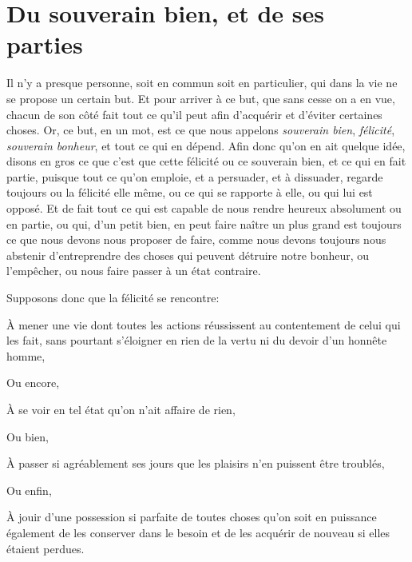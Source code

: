 
\section{Du souverain bien, et de ses parties}

Il n'y a presque personne, soit en commun soit en particulier, qui dans la vie ne se propose un certain
but. Et pour arriver à ce but, que sans cesse on a en vue, chacun de son côté fait tout ce qu'il peut afin
d'acquérir et d'éviter certaines choses. Or, ce but, en un mot, est ce que nous appelons \emph{souverain
bien}, \emph{félicité}, \emph{souverain bonheur}, et tout ce qui en dépend. Afin donc qu'on en ait quelque
idée, disons en gros ce que c'est que cette félicité ou ce souverain bien, et ce qui en fait partie, puisque
tout ce qu'on emploie, et a persuader, et à dissuader, regarde toujours ou la félicité elle même, ou ce qui
se rapporte à elle, ou qui lui est opposé. Et de fait tout ce qui est capable de nous rendre heureux absolument
ou en partie, ou qui, d'un petit bien, en peut faire naître un plus grand est toujours ce que nous devons nous
proposer de faire, comme nous devons toujours nous abstenir d'entreprendre des choses qui peuvent détruire
notre bonheur, ou l'empêcher, ou nous faire passer à un état contraire. 

Supposons donc que la félicité se rencontre:

\begin{emphpar}
     À mener une vie dont toutes les actions réussissent au contentement de celui qui les fait, sans pourtant
	 s'éloigner en rien de la vertu ni du devoir d'un honnête homme,
\end{emphpar}

Ou encore, 

\begin{emphpar}
     À se voir en tel état qu'on n'ait affaire de rien,
\end{emphpar}

Ou bien,

\begin{emphpar}
     À passer si agréablement ses jours que les plaisirs n'en puissent être troublés,
\end{emphpar}

Ou enfin,

\begin{emphpar}
     À jouir d'une possession si parfaite de toutes choses qu'on soit en puissance également de les conserver
	 dans le besoin et de les acquérir de nouveau si elles étaient perdues.
\end{emphpar}


